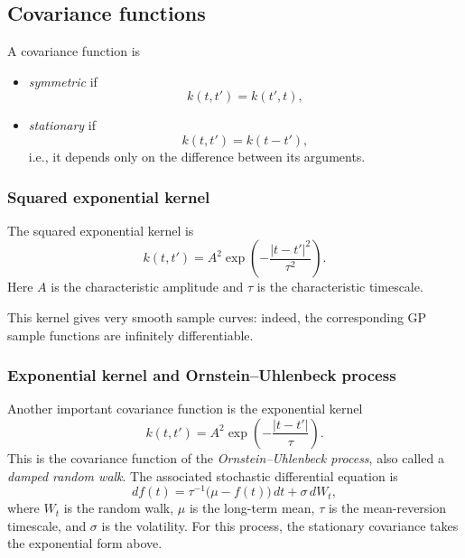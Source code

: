 \documentclass[11pt, titlepage]{article} %
\numberwithin{equation}{section}
\theoremstyle{definition}
\numberwithin{assumption}{section}
\begin{document}
\subsection{Covariance functions}
A covariance function is
\begin{itemize}
    \item \textit{symmetric} if
    \begin{equation*}
        k(t,t')=k(t',t),
    \end{equation*}
    \item \textit{stationary} if 
    \begin{equation*}
        k(t,t')=k(t-t'),
    \end{equation*}
    i.e., it depends only on the difference between its arguments.
\end{itemize}


\subsubsection*{Squared exponential kernel}

The squared exponential kernel is
\begin{equation*}
    k(t,t')
    =
    A^2\exp\!\left(-\frac{|t-t'|^2}{\tau^2}\right).
\end{equation*}
Here $A$ is the characteristic amplitude and $\tau$ is the characteristic timescale.

This kernel gives very smooth sample curves: indeed, the corresponding GP sample functions are infinitely differentiable.


\subsubsection*{Exponential kernel and Ornstein--Uhlenbeck process}

Another important covariance function is the exponential kernel
\begin{equation*}
    k(t,t')
    =
    A^2\exp\!\left(-\frac{|t-t'|}{\tau}\right).
\end{equation*}
This is the covariance function of the \textit{Ornstein--Uhlenbeck process}, also called a \textit{damped random walk}. The associated stochastic differential equation is
\begin{equation*}
    df(t)=\tau^{-1}\bigl(\mu-f(t)\bigr)\,dt+\sigma\,dW_t,
\end{equation*}
where $W_t$ is the random walk, $\mu$ is the long-term mean, $\tau$ is the mean-reversion timescale, and $\sigma$ is the volatility. For this process, the stationary covariance takes the exponential form above.
\end{document}
